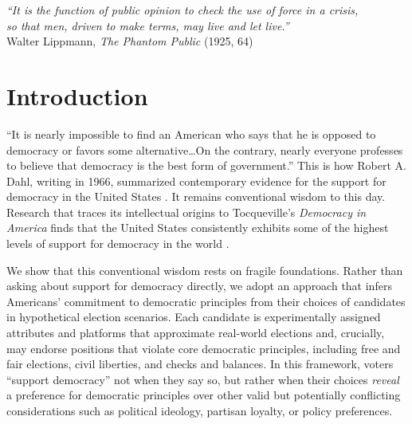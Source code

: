 \documentclass[letterpaper, 12pt]{article}
\begin{document}
\begin{raggedright}
\restoregeometry
\setlength{\topmargin}{-0.5in}
\setlength{\textheight}{8.5in}
\parindent=0.25in

\begin{flushright}
\textit{``It is the function of public opinion to check the use of force in a crisis,\\ so that men, driven to make terms, may live and let live.''}\\
Walter Lippmann, \emph{The Phantom Public} (1925, 64)
\end{flushright}

\section{Introduction}

``It is nearly impossible to find an American who says that he is opposed to democracy or favors some alternative\dots On the contrary, nearly everyone professes to believe that democracy is the best form of government.'' This is how Robert A. Dahl, writing in 1966, summarized contemporary evidence for the support for democracy in the United States \citep[40]{Dahl1966}. It remains conventional wisdom to this day. Research that traces its intellectual origins to Tocqueville's \emph{Democracy in America} finds that the United States consistently exhibits some of the highest levels of support for democracy in the world \citep{Almond1963, Inglehart2010, Norris2011}.

We show that this conventional wisdom rests on fragile foundations. Rather than asking about support for democracy directly, we adopt an approach that infers Americans' commitment to democratic principles from their choices of candidates in hypothetical election scenarios. Each candidate is experimentally assigned attributes and platforms that approximate real-world elections and, crucially, may endorse positions that violate core democratic principles, including free and fair elections, civil liberties, and checks and balances. In this framework, voters ``support democracy'' not when they say so, but rather when their choices \emph{reveal} a preference for democratic principles over other valid but potentially conflicting considerations such as political ideology, partisan loyalty, or policy preferences.


\end{raggedright}
\end{document}
